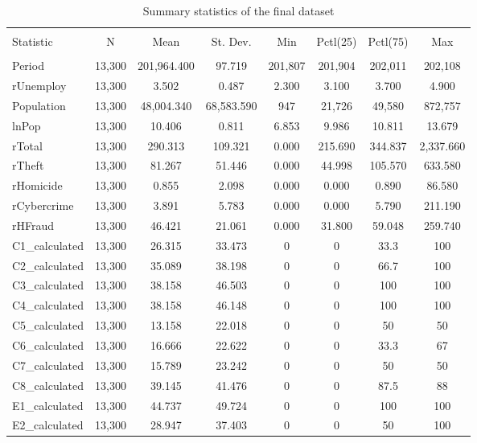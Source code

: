 \begin{table}[!htbp] \centering 
  \caption{Summary statistics of the final dataset} 
  \label{table:sumstat} 
\begin{tabular}{@{\extracolsep{5pt}}lccccccc} 
\\[-1.8ex]\hline 
\hline \\[-1.8ex] 
Statistic & \multicolumn{1}{c}{N} & \multicolumn{1}{c}{Mean} & \multicolumn{1}{c}{St. Dev.} & \multicolumn{1}{c}{Min} & \multicolumn{1}{c}{Pctl(25)} & \multicolumn{1}{c}{Pctl(75)} & \multicolumn{1}{c}{Max} \\ 
\hline \\[-1.8ex] 
Period & 13,300 & 201,964.400 & 97.719 & 201,807 & 201,904 & 202,011 & 202,108 \\ 
rUnemploy & 13,300 & 3.502 & 0.487 & 2.300 & 3.100 & 3.700 & 4.900 \\ 
Population & 13,300 & 48,004.340 & 68,583.590 & 947 & 21,726 & 49,580 & 872,757 \\ 
lnPop & 13,300 & 10.406 & 0.811 & 6.853 & 9.986 & 10.811 & 13.679 \\ 
rTotal & 13,300 & 290.313 & 109.321 & 0.000 & 215.690 & 344.837 & 2,337.660 \\ 
rTheft & 13,300 & 81.267 & 51.446 & 0.000 & 44.998 & 105.570 & 633.580 \\ 
rHomicide & 13,300 & 0.855 & 2.098 & 0.000 & 0.000 & 0.890 & 86.580 \\ 
rCybercrime & 13,300 & 3.891 & 5.783 & 0.000 & 0.000 & 5.790 & 211.190 \\ 
rHFraud & 13,300 & 46.421 & 21.061 & 0.000 & 31.800 & 59.048 & 259.740 \\ 
C1\_calculated & 13,300 & 26.315 & 33.473 & 0 & 0 & 33.3 & 100 \\ 
C2\_calculated & 13,300 & 35.089 & 38.198 & 0 & 0 & 66.7 & 100 \\ 
C3\_calculated & 13,300 & 38.158 & 46.503 & 0 & 0 & 100 & 100 \\ 
C4\_calculated & 13,300 & 38.158 & 46.148 & 0 & 0 & 100 & 100 \\ 
C5\_calculated & 13,300 & 13.158 & 22.018 & 0 & 0 & 50 & 50 \\ 
C6\_calculated & 13,300 & 16.666 & 22.622 & 0 & 0 & 33.3 & 67 \\ 
C7\_calculated & 13,300 & 15.789 & 23.242 & 0 & 0 & 50 & 50 \\ 
C8\_calculated & 13,300 & 39.145 & 41.476 & 0 & 0 & 87.5 & 88 \\ 
E1\_calculated & 13,300 & 44.737 & 49.724 & 0 & 0 & 100 & 100 \\ 
E2\_calculated & 13,300 & 28.947 & 37.403 & 0 & 0 & 50 & 100 \\ 
\end{tabular} 
\end{table} 